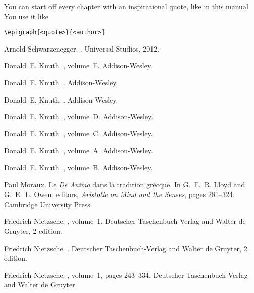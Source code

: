 \documentclass[book]{scrbook}
\begin{document}
You can start off every chapter with an inspirational quote, like in this manual. You use it like
\begin{verbatim}
\epigraph{<quote>}{<author>}
\end{verbatim}

\appendix
\blinddocument

\pagestyle{references}
\begin{thebibliography}{99}
Arnold Schwarzenegger.
.
\newblock Universal Studios, 2012.

Donald~E. Knuth.
, volume~E.
\newblock Addison-Wesley.

Donald~E. Knuth.
.
\newblock Addison-Wesley.

Donald~E. Knuth.
.
\newblock Addison-Wesley.

Donald~E. Knuth.
, volume~D.
\newblock Addison-Wesley.

Donald~E. Knuth.
, volume~C.
\newblock Addison-Wesley.

Donald~E. Knuth.
, volume~A.
\newblock Addison-Wesley.

Donald~E. Knuth.
, volume~B.
\newblock Addison-Wesley.

Paul Moraux.
\newblock Le \emph{De Anima} dans la tradition gr{\`e}cque.
\newblock In G.~E.~R. Lloyd and G.~E.~L. Owen, editors, {\em Aristotle on Mind
  and the Senses}, pages 281--324. Cambridge University Press.

Friedrich Nietzsche.
, volume~1.
\newblock Deutscher Taschenbuch-Verlag and Walter de Gruyter, 2 edition.

Friedrich Nietzsche.
.
\newblock Deutscher Taschenbuch-Verlag and Walter de Gruyter, 2 edition.

Friedrich Nietzsche.
, volume~1,
  pages 243--334.
\newblock Deutscher Taschenbuch-Verlag and Walter de Gruyter.


\end{thebibliography}
\end{document}
